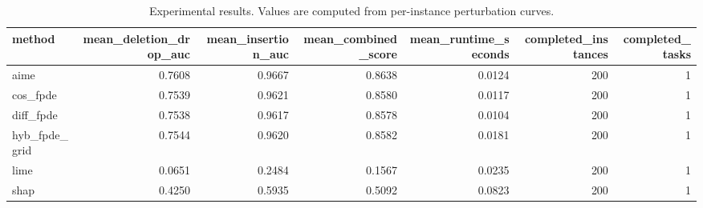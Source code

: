 \begin{table}[t]
\caption{Experimental results. Values are computed from per-instance perturbation curves.}
\label{tab:main_results_computed}
\centering
\begin{tabular}{lrrrrrr}
\toprule
method & mean\_deletion\_drop\_auc & mean\_insertion\_auc & mean\_combined\_score & mean\_runtime\_seconds & completed\_instances & completed\_tasks \\
\midrule
aime & 0.7608 & 0.9667 & 0.8638 & 0.0124 & 200 & 1 \\
cos\_fpde & 0.7539 & 0.9621 & 0.8580 & 0.0117 & 200 & 1 \\
diff\_fpde & 0.7538 & 0.9617 & 0.8578 & 0.0104 & 200 & 1 \\
hyb\_fpde\_grid & 0.7544 & 0.9620 & 0.8582 & 0.0181 & 200 & 1 \\
lime & 0.0651 & 0.2484 & 0.1567 & 0.0235 & 200 & 1 \\
shap & 0.4250 & 0.5935 & 0.5092 & 0.0823 & 200 & 1 \\
\bottomrule
\end{tabular}

\end{table}
